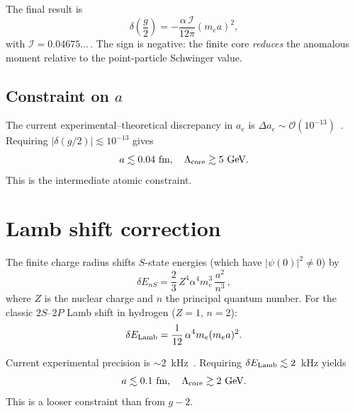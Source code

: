 ﻿\documentclass[a4paper,12pt]{article}
\newcommand{\order}[1]{\mathcal{O}(#1)}
\begin{document}
The final result is
\begin{equation}
  \boxed{\delta\!\left(\frac{g}{2}\right)
    = -\frac{\alpha\,\mathcal{I}}{12\pi}(m_e a)^2},
  \label{eq:g2}
\end{equation}
with $\mathcal{I}=0.04675\ldots$\,.  The sign is negative: the finite
core \emph{reduces} the anomalous moment relative to the point-particle
Schwinger value.

\subsection{Constraint on $a$}

The current experimental--theoretical discrepancy in $a_e$ is
$\Delta a_e\sim\order{10^{-13}}$~\cite{Fan2023}.  Requiring
$|\delta(g/2)|\lesssim 10^{-13}$ gives
\begin{equation}
  a \lesssim 0.04~\text{fm},\quad
  \Lambda_{\rm core}\gtrsim 5~\text{GeV}.
  \label{eq:g2bound}
\end{equation}
This is the intermediate atomic constraint.

\section{Lamb shift correction}
\label{sec:lamb}

The finite charge radius shifts $S$-state energies (which have
$|\psi(0)|^2\neq 0$) by~\cite{Weinberg1995}
\begin{equation}
  \delta E_{nS} = \frac{2}{3}\,Z^4\alpha^4 m_e^3\,\frac{a^2}{n^3}\,,
  \label{eq:lamb}
\end{equation}
where $Z$ is the nuclear charge and $n$ the principal quantum number.
For the classic $2S$--$2P$ Lamb shift in hydrogen ($Z=1$, $n=2$):
\begin{equation}
  \delta E_{\rm Lamb} = \frac{1}{12}\,\alpha^4 m_e(m_e a)^2.
\end{equation}

Current experimental precision is $\sim 2$~kHz~\cite{Bezginov2019}.
Requiring $\delta E_{\rm Lamb}\lesssim 2$~kHz yields
\begin{equation}
  a \lesssim 0.1~\text{fm},\quad
  \Lambda_{\rm core}\gtrsim 2~\text{GeV}.
  \label{eq:lambbound}
\end{equation}
This is a looser constraint than from $g{-}2$.

\end{document}
